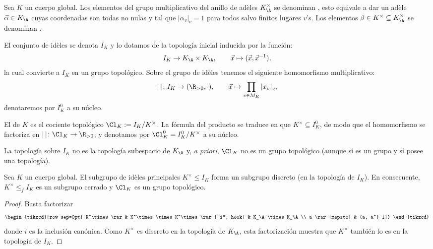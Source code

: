 \documentclass[teoria-numeros.tex]{subfiles}
\begin{document}
\begin{mydef}
	Sea $K$ un cuerpo global.
	Los elementos del grupo multiplicativo del anillo de adèles $K_\A^\times$ se denominan , esto equivale a dar un adèle
	$\vec\alpha \in K_\A$ cuyas coordenadas son todas no nulas y tal que $|\alpha_v|_v = 1$ para todos salvo finitos lugares $v$'s.
	Los elementos $\beta \in K^\times \subseteq K_\A^\times$ se denominan .

	El conjunto de idèles se denota $I_K$ y lo dotamos de la topología inicial inducida por la función:
	$$ I_K \to K_\A \times K_\A, \qquad \vec x \mapsto (\vec x, \vec x^{-1}), $$
	la cual convierte a $I_K$ en un grupo topológico.
	Sobre el grupo de idèles tenemos el siguiente homomorfismo multiplicativo:
	$$ |\,| \colon I_K \to (\R_{> 0}, \cdot), \qquad \vec x \mapsto \prod_{v\in M_K} |x_v|_v, $$
	denotaremos por $I_K^0$ a su núcleo.

	El  de $K$ es el cociente topológico $\Cl_K := I_K / K^\times$.
	La fórmula del producto se traduce en que $K^\times \subseteq I_K^0$, de modo que el homomorfismo se factoriza en $|\,|\colon \Cl_K \to \R_{>0}$;
	y denotamos por $\Cl_K^0 = I_K^0/K^\times$ a su núcleo.
\end{mydef}
\warn
La topología sobre $I_K$ \underline{no} es la topología subespacio de $K_\A$ y, \textit{a priori}, $\Cl_K$ no es un grupo topológico
(aunque sí es un grupo y sí posee una topología).

\begin{prop}
	Sea $K$ un cuerpo global.
	El subgrupo de idèles principales $K^\times \le I_K$ forma un subgrupo discreto (en la topología de $I_K$).
	En consecuente, $K^\times \le_f I_K$ es un subgrupo cerrado y $\Cl_K$ es un grupo topológico.
\end{prop}
\begin{proof}
	Basta factorizar
	\[\begin{tikzcd}[row sep=0pt]
		K^\times \rar & K^\times \times K^\times \rar["i", hook] & K_\A \times K_\A \\
		a \rar[mapsto] & (a, a^{-1})
	\end{tikzcd}\]
	donde $i$ es la inclusión canónica.
	Como $K^\times$ es discreto en la topología de $K_\A$, esta factorización muestra que $K^\times$ también lo es en la topología de $I_K$.
\end{proof}

\addtocounter{thmi}{1}
\end{document}
